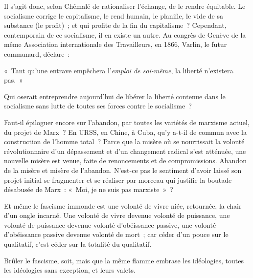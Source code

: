 \documentclass[french,twoside]{book} %
\newcommand{\astermono}{\medskip\centerline{\color{rubric}\large\selectfont{\syms ✻}}\medskip\par}%
\newenvironment{quoteblock}%
  {\begin{quoting}}
  {\end{quoting}}
\newenvironment{quotebar}{%
    \def\FrameCommand{{\color{rubric!10!}\vrule width 0.5em} \hspace{0.9em}}%
    \def\OuterFrameSep{\itemsep} %
    \MakeFramed {\advance\hsize-\width \FrameRestore}
  }%
  {%
    \endMakeFramed
  }
\renewenvironment{quoteblock}%
  {%
    \savenotes
    \setstretch{0.9}
    \normalfont
    \begin{quotebar}
  }
  {%
    \end{quotebar}
    \spewnotes
  }
\begin{document}
\noindent Il s’agit donc, selon Chémalé de rationaliser l’échange, de le rendre équitable. Le socialisme corrige le capitalisme, le rend humain, le planifie, le vide de sa substance (le profit) ; et qui profite de la fin du capitalisme ? Cependant, contemporain de ce socialisme, il en existe un autre. Au congrès de Genève de la même Association internationale des Travailleurs, en 1866, Varlin, le futur communard, déclare :\par

\begin{quoteblock}
\noindent « Tant qu’une entrave empêchera l’\emph{emploi de soi-même}, la liberté n’existera pas. »\end{quoteblock}

\noindent Qui oserait entreprendre aujourd’hui de libérer la liberté contenue dans le socialisme sans lutte de toutes ses forces contre le socialisme ?\par
Faut-il épiloguer encore sur l’abandon, par toutes les variétés de marxisme actuel, du projet de Marx ? En URSS, en Chine, à Cuba, qu’y a-t-il de commun avec la construction de l’homme total ? Parce que la misère où se nourrissait la volonté révolutionnaire d’un dépassement et d’un changement radical s’est atténuée, une nouvelle misère est venue, faite de renoncements et de compromissions. Abandon de la misère et misère de l’abandon. N’est-ce pas le sentiment d’avoir laissé son projet initial se fragmenter et se réaliser par morceau qui justifie la boutade désabusée de Marx : « Moi, je ne suis pas marxiste » ?\par
Et même le fascisme immonde est une volonté de vivre niée, retournée, la chair d’un ongle incarné. Une volonté de vivre devenue volonté de puissance, une volonté de puissance devenue volonté d’obéissance passive, une volonté d’obéissance passive devenue volonté de mort ; car céder d’un pouce sur le qualitatif, c’est céder sur la totalité du qualitatif.\par
Brûler le fascisme, soit, mais que la même flamme embrase les idéologies, toutes les idéologies sans exception, et leurs valets.\par

\astermono
\end{document}
